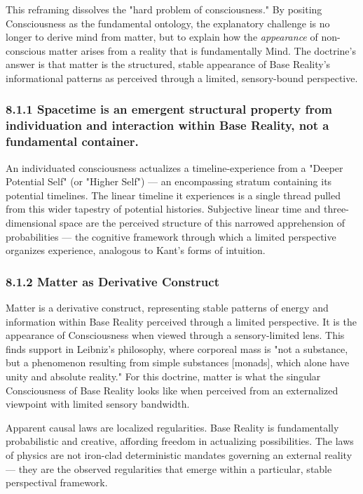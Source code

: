 This reframing dissolves the "hard problem of consciousness." By positing Consciousness as the fundamental ontology, the explanatory challenge is no longer to derive mind from matter, but to explain how the \textit{appearance} of non-conscious matter arises from a reality that is fundamentally Mind. The doctrine's answer is that matter is the structured, stable appearance of Base Reality's informational patterns as perceived through a limited, sensory-bound perspective.


\subsubsection*{8.1.1 Spacetime is an emergent structural property from individuation and interaction within Base Reality, not a fundamental container.}


An individuated consciousness actualizes a timeline-experience from a "Deeper Potential Self" (or "Higher Self") — an encompassing stratum containing its potential timelines. The linear timeline it experiences is a single thread pulled from this wider tapestry of potential histories. Subjective linear time and three-dimensional space are the perceived structure of this narrowed apprehension of probabilities — the cognitive framework through which a limited perspective organizes experience, analogous to Kant's forms of intuition.


\subsubsection*{8.1.2 Matter as Derivative Construct}


Matter is a derivative construct, representing stable patterns of energy and information within Base Reality perceived through a limited perspective. It is the appearance of Consciousness when viewed through a sensory-limited lens. This finds support in Leibniz's philosophy, where corporeal mass is "not a substance, but a phenomenon resulting from simple substances [monads], which alone have unity and absolute reality." For this doctrine, matter is what the singular Consciousness of Base Reality looks like when perceived from an externalized viewpoint with limited sensory bandwidth.


Apparent causal laws are localized regularities. Base Reality is fundamentally probabilistic and creative, affording freedom in actualizing possibilities. The laws of physics are not iron-clad deterministic mandates governing an external reality — they are the observed regularities that emerge within a particular, stable perspectival framework.


